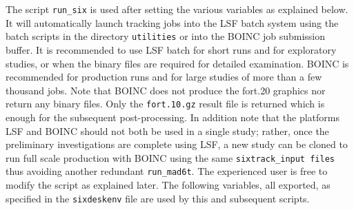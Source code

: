 \documentclass{cernatsnote}
\begin{document}
The script \texttt{run\_six} is used after setting the various variables as
explained below.  It will automatically launch tracking jobs into the LSF
batch system using the batch scripts in the directory \texttt{utilities} or
into the BOINC job submission buffer.  It is recommended to use LSF batch for
short runs and for exploratory studies, or when the binary files are required
for detailed examination.  BOINC is recommended for production runs and for
large studies of more than a few thousand jobs. Note that BOINC does not
produce the fort.20 graphics nor return any binary files. Only the
\texttt{fort.10.gz}  result file is returned which is enough for the
subsequent post-processing.  In addition note that the platforms LSF and BOINC
should not both be used in a single study; rather, once the preliminary
investigations are complete using LSF, a new study can be cloned to run full
scale production with BOINC using the same {\tt sixtrack\_input files} thus
avoiding another redundant \texttt{run\_mad6t}.  The experienced user is free
to modify the script as explained later.  The following variables, all
exported, as specified in the \texttt{sixdeskenv} file are used by this and
subsequent scripts.
\end{document}

